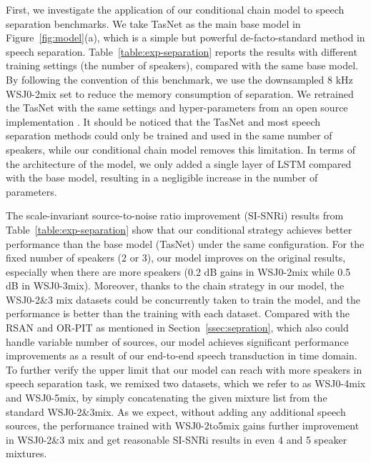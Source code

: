 \documentclass{article}
\begin{document}
First, we investigate the application of our conditional chain model to speech separation benchmarks.
We take TasNet as the main base model in Figure~\ref{fig:model}(a), which is a simple but powerful de-facto-standard method in speech separation.
Table~\ref{table:exp-separation} reports the results with different training settings (the number of speakers), compared with the same base model. 
By following the convention of this benchmark, we use the downsampled 8 kHz WSJ0-2mix set to reduce the memory consumption of separation.
We retrained the TasNet with the same settings and hyper-parameters from an open source implementation \cite{kaituo-tasnet}. It should be noticed that the TasNet and most speech separation methods could only be trained and used in the same number of speakers, while our conditional chain model removes this limitation. In terms of the architecture of the model, we only added a single layer of LSTM compared with the base model, resulting in a negligible increase in the number of parameters.  

The scale-invariant source-to-noise ratio improvement (SI-SNRi) results from Table~\ref{table:exp-separation} show that our conditional strategy achieves better performance than the base model (TasNet) under the same configuration. For the fixed number of speakers (2 or 3), our model improves on the original results, especially when there are more speakers (0.2 dB gains in WSJ0-2mix while 0.5 dB in WSJ0-3mix). Moreover, thanks to the chain strategy in our model, the WSJ0-2\&3 mix datasets could be concurrently taken to train the model, and the performance is better than the training with each dataset. 
Compared with the RSAN \cite{kinoshita2018listening} and OR-PIT \cite{takahashi2019recursive} as mentioned in Section~\ref{ssec:sepration}, which also could handle variable number of sources, our model achieves significant performance improvements as a result of our end-to-end speech transduction in time domain.
To further verify the upper limit that our model can reach with more speakers in speech separation task, we remixed two datasets, which we refer to as WSJ0-4mix and WSJ0-5mix, by simply concatenating the given mixture list from the standard WSJ0-2\&3mix. As we expect, without adding any additional speech sources, the performance trained with WSJ0-2to5mix gains further improvement in WSJ0-2\&3 mix and get reasonable SI-SNRi results in even 4 and 5 speaker mixtures. 
\end{document}
